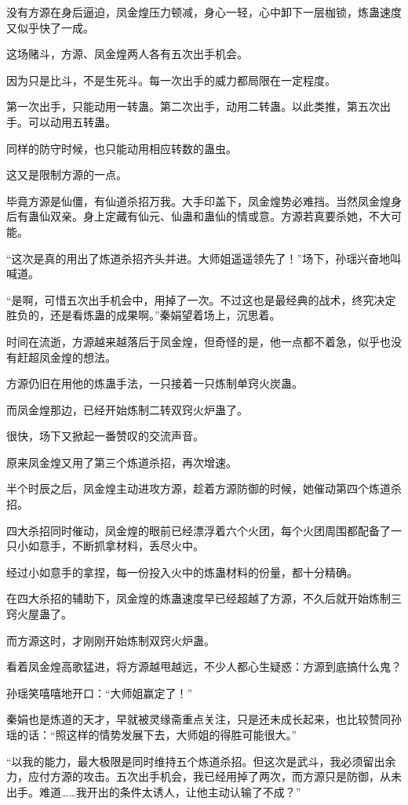 \begin{this_body}
没有方源在身后逼迫，凤金煌压力顿减，身心一轻，心中卸下一层枷锁，炼蛊速度又似乎快了一成。

这场赌斗，方源、凤金煌两人各有五次出手机会。

因为只是比斗，不是生死斗。每一次出手的威力都局限在一定程度。

第一次出手，只能动用一转蛊。第二次出手，动用二转蛊。以此类推，第五次出手。可以动用五转蛊。

同样的防守时候，也只能动用相应转数的蛊虫。

这又是限制方源的一点。

毕竟方源是仙僵，有仙道杀招万我。大手印盖下，凤金煌势必难挡。当然凤金煌身后有蛊仙双亲。身上定藏有仙元、仙蛊和蛊仙的情或意。方源若真要杀她，不大可能。

“这次是真的用出了炼道杀招齐头并进。大师姐遥遥领先了！”场下，孙瑶兴奋地叫喊道。

“是啊，可惜五次出手机会中，用掉了一次。不过这也是最经典的战术，终究决定胜负的，还是看炼蛊的成果啊。”秦娟望着场上，沉思着。

时间在流逝，方源越来越落后于凤金煌，但奇怪的是，他一点都不着急，似乎也没有赶超凤金煌的想法。

方源仍旧在用他的炼蛊手法，一只接着一只炼制单窍火炭蛊。

而凤金煌那边，已经开始炼制二转双窍火炉蛊了。

很快，场下又掀起一番赞叹的交流声音。

原来凤金煌又用了第三个炼道杀招，再次增速。

半个时辰之后，凤金煌主动进攻方源，趁着方源防御的时候，她催动第四个炼道杀招。

四大杀招同时催动，凤金煌的眼前已经漂浮着六个火团，每个火团周围都配备了一只小如意手，不断抓拿材料，丢尽火中。

经过小如意手的拿捏，每一份投入火中的炼蛊材料的份量，都十分精确。

在四大杀招的辅助下，凤金煌的炼蛊速度早已经超越了方源，不久后就开始炼制三窍火屋蛊了。

而方源这时，才刚刚开始炼制双窍火炉蛊。

看着凤金煌高歌猛进，将方源越甩越远，不少人都心生疑惑：方源到底搞什么鬼？

孙瑶笑嘻嘻地开口：“大师姐赢定了！”

秦娟也是炼道的天才，早就被灵缘斋重点关注，只是还未成长起来，也比较赞同孙瑶的话：“照这样的情势发展下去，大师姐的得胜可能很大。”

“以我的能力，最大极限是同时维持五个炼道杀招。但这次是武斗，我必须留出余力，应付方源的攻击。五次出手机会，我已经用掉了两次，而方源只是防御，从未出手。难道……我开出的条件太诱人，让他主动认输了不成？”


\end{this_body}
